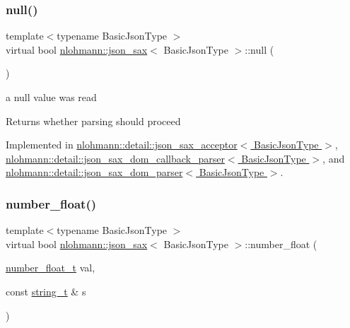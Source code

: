 \mbox{\label{structnlohmann_1_1json__sax_a0ad26edef3f8d530dcec3192bba82df6}} 
\subsubsection{\texorpdfstring{null()}{null()}}
{\footnotesize\ttfamily template$<$typename Basic\+Json\+Type $>$ \\
virtual bool \hyperlink{structnlohmann_1_1json__sax}{nlohmann\+::json\+\_\+sax}$<$ Basic\+Json\+Type $>$\+::null (\begin{DoxyParamCaption}{ }\end{DoxyParamCaption})\hspace{0.3cm}{\ttfamily [pure virtual]}}



a null value was read 

\begin{DoxyReturn}{Returns}
whether parsing should proceed 
\end{DoxyReturn}


Implemented in \hyperlink{classnlohmann_1_1detail_1_1json__sax__acceptor_a173c310b2f829b2c49645af8336c27b8}{nlohmann\+::detail\+::json\+\_\+sax\+\_\+acceptor$<$ Basic\+Json\+Type $>$}, \hyperlink{classnlohmann_1_1detail_1_1json__sax__dom__callback__parser_a2db7733c5d6fb6135f03f8b64811baf4}{nlohmann\+::detail\+::json\+\_\+sax\+\_\+dom\+\_\+callback\+\_\+parser$<$ Basic\+Json\+Type $>$}, and \hyperlink{classnlohmann_1_1detail_1_1json__sax__dom__parser_a0ec9faafc4b8d4052a6ed6d3b720d748}{nlohmann\+::detail\+::json\+\_\+sax\+\_\+dom\+\_\+parser$<$ Basic\+Json\+Type $>$}.

\mbox{\label{structnlohmann_1_1json__sax_ae7c31614e8a82164d2d7f8dbf4671b25}} 
\subsubsection{\texorpdfstring{number\+\_\+float()}{number\_float()}}
{\footnotesize\ttfamily template$<$typename Basic\+Json\+Type $>$ \\
virtual bool \hyperlink{structnlohmann_1_1json__sax}{nlohmann\+::json\+\_\+sax}$<$ Basic\+Json\+Type $>$\+::number\+\_\+float (\begin{DoxyParamCaption}\item[{\hyperlink{structnlohmann_1_1json__sax_a390c209bffd8c4800c8f3076dc465a20}{number\+\_\+float\+\_\+t}}]{val,  }\item[{const \hyperlink{structnlohmann_1_1json__sax_ae01977a9f3c5b3667b7a2929ed91061e}{string\+\_\+t} \&}]{s }\end{DoxyParamCaption})\hspace{0.3cm}{\ttfamily [pure virtual]}}




